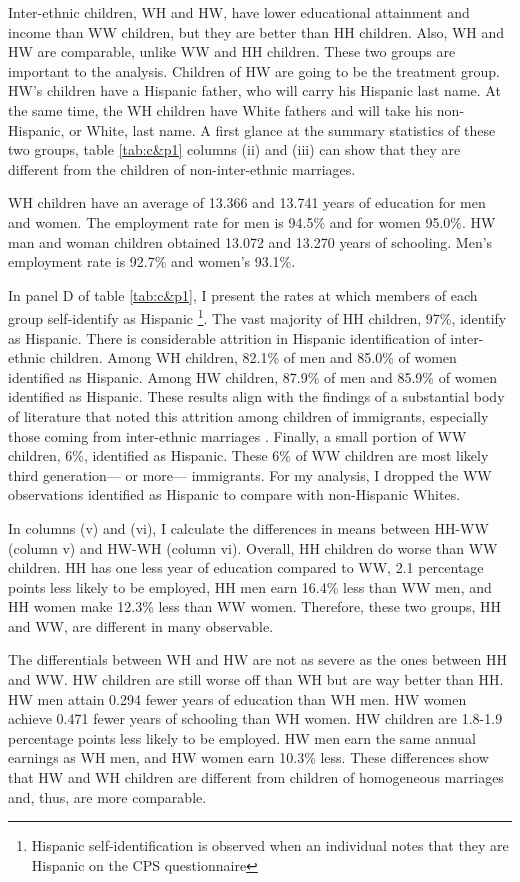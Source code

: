 \documentclass{wptemp}
\begin{document}
Inter-ethnic children, WH and HW, have lower educational attainment and income than WW children, but they are better than HH children. Also, WH and HW are comparable, unlike WW and HH children. These two groups are important to the analysis. Children of HW are going to be the treatment group. HW's children have a Hispanic father, who will carry his Hispanic last name. At the same time, the WH children have White fathers and will take his non-Hispanic, or White, last name. A first glance at the summary statistics of these two groups, table \ref{tab:c&p1} columns (ii) and (iii) can show that they are different from the children of non-inter-ethnic marriages. 

WH children have an average of 13.366 and 13.741 years of education for men and women. The employment rate for men is 94.5\% and for women 95.0\%. HW man and woman children obtained 13.072 and 13.270 years of schooling. Men's employment rate is 92.7\% and women's 93.1\%.

In panel D of table \ref{tab:c&p1}, I present the rates at which members of each group self-identify as Hispanic \footnote{Hispanic self-identification is observed when an individual notes that they are Hispanic on the CPS questionnaire}. The vast majority of HH children, 97\%, identify as Hispanic. There is considerable attrition in Hispanic identification of inter-ethnic children. Among WH children, 82.1\% of men and 85.0\% of women identified as Hispanic. Among HW children, 87.9\% of men and 85.9\% of women identified as Hispanic. These results align with the findings of a substantial body of literature that noted this attrition among children of immigrants, especially those coming from inter-ethnic marriages \citep{duncan2017complexity, duncan2018identifying, duncan2020new, antman2020ethnic}. Finally, a small portion of WW children, 6\%, identified as Hispanic. These 6\% of WW children are most likely third generation--- or more--- immigrants. For my analysis, I dropped the WW observations identified as Hispanic to compare with non-Hispanic Whites.

In columns (v) and (vi), I calculate the differences in means between HH-WW (column v) and HW-WH (column vi). Overall, HH children do worse than WW children. HH has one less year of education compared to WW, 2.1 percentage points less likely to be employed, HH men earn 16.4\% less than WW men, and HH women make 12.3\% less than WW women. Therefore, these two groups, HH and WW, are different in many observable.

The differentials between WH and HW are not as severe as the ones between HH and WW. HW children are still worse off than WH but are way better than HH. HW men attain 0.294 fewer years of education than WH men. HW women achieve 0.471 fewer years of schooling than WH women. HW children are 1.8-1.9 percentage points less likely to be employed. HW men earn the same annual earnings as WH men, and HW women earn 10.3\% less. These differences show that HW and WH children are different from children of homogeneous marriages and, thus, are more comparable.
\end{document}
